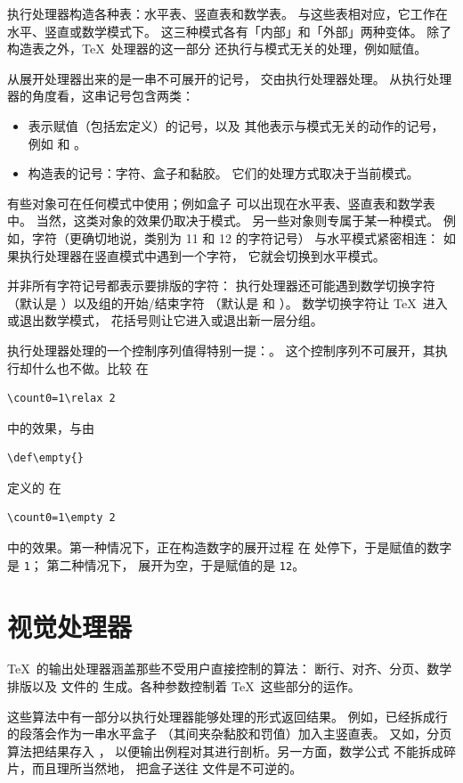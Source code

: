 \documentclass[a4paper]{rapport3}
\begin{document}
执行处理器构造各种表：水平表、竖直表和数学表。
与这些表相对应，它工作在水平、竖直或数学模式下。
这三种模式各有「内部」和「外部」两种变体。
除了构造表之外，\TeX\ 处理器的这一部分
还执行与模式无关的处理，例如赋值。

从展开处理器出来的是一串不可展开的记号，
交由执行处理器处理。
\relax 从执行处理器的角度看，这串记号包含两类：
\begin{itemize}
\item 表示赋值（包括宏定义）的记号，以及
      其他表示与模式无关的动作的记号，
      例如  和 。
\item 构造表的记号：字符、盒子和黏胶。
      它们的处理方式取决于当前模式。
\end{itemize}

有些对象可在任何模式中使用；例如盒子
可以出现在水平表、竖直表和数学表中。
当然，这类对象的效果仍取决于模式。
另一些对象则专属于某一种模式。
例如，字符（更确切地说，类别为 11 和 12 的字符记号）
与水平模式紧密相连：
如果执行处理器在竖直模式中遇到一个字符，
它就会切换到水平模式。

并非所有字符记号都表示要排版的字符：
执行处理器还可能遇到数学切换字符
\awp
（默认是 ）以及组的开始/结束字符
（默认是  和 ）。
数学切换字符让 \TeX\ 进入或退出数学模式，
花括号则让它进入或退出新一层分组。

执行处理器处理的一个控制序列值得特别一提：。
这个控制序列不可展开，其执行却什么也不做。比较  在
\begin{verbatim}
\count0=1\relax 2
\end{verbatim}
中的效果，与由 \begin{verbatim}
\def\empty{}
\end{verbatim}
定义的  在
\begin{verbatim}
\count0=1\empty 2
\end{verbatim}
中的效果。第一种情况下，正在构造数字的展开过程
在  处停下，于是赋值的数字是 {\tt 1}；
第二种情况下， 展开为空，于是赋值的是 {\tt 12}。

\section{视觉处理器}

\TeX\ 的输出处理器涵盖那些不受用户直接控制的算法：
断行、对齐、分页、数学排版以及  文件的
生成。各种参数控制着 \TeX\ 这些部分的运作。

这些算法中有一部分以执行处理器能够处理的形式返回结果。
例如，已经拆成行的段落会作为一串水平盒子
（其间夹杂黏胶和罚值）加入主竖直表。
又如，分页算法把结果存入 ，
以便输出例程对其进行剖析。另一方面，数学公式
不能拆成碎片，而且理所当然地，
把盒子送往  文件是不可逆的。
\end{document}
